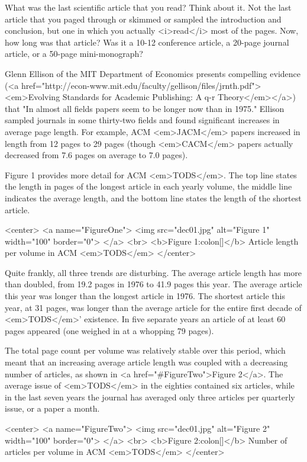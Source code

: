 What was the last scientific article that you read? Think about it.
Not the last article that you paged through or
skimmed or sampled the introduction and conclusion, but one in which you
actually <i>read</i> most of the pages. Now, how long was that article? 
Was it a 10-12
conference article, a 20-page journal article, or a 50-page mini-monograph?

Glenn Ellison of the MIT Department of Economics presents compelling
evidence (<a href="http://econ-www.mit.edu/faculty/gellison/files/jrnth.pdf"><em>Evolving Standards for Academic Publishing: A q-r Theory</em></a>) that
"In almost all fields papers seem to be longer now than in 1975." Ellison
sampled journals in some thirty-two fields and found significant increases
in average page length. For example, ACM <em>JACM</em> papers increased in
length from 12 pages to 29 pages (though <em>CACM</em> papers actually
decreased from 7.6 pages on average to 7.0 pages).

Figure 1 provides more detail for ACM <em>TODS</em>. The top
line states the length in pages of the longest article in each yearly
volume, the middle line indicates the average length, and the bottom
line states the length of the shortest article.

<center>
<a name="FigureOne">
<img src="dec01.jpg" alt="Figure 1" width="100" border="0">
</a>
<br>
<b>Figure 1:colon[]</b> Article length per volume in ACM <em>TODS</em>
</center>

Quite frankly, all three trends are disturbing. The average article length
has more than doubled, from 19.2 pages in 1976 to 41.9 pages this year. The
average article this year was longer than the longest article in 1976. The
shortest article this year, at 31 pages, was longer than the average article
for the entire first decade of <em>TODS</em>' existence. In five separate years
an article of at least 60 pages appeared (one weighed in at a whopping 79
pages).

The total page count per volume was relatively stable over this period,
which meant that an increasing average article length was coupled with a
decreasing number of articles, as shown in <a href="#FigureTwo">Figure 2</a>. 
The average
issue of <em>TODS</em> in the eighties contained six articles, while in the
last seven years the journal has averaged only three articles per quarterly
issue, or a paper a month.

<center>
<a name="FigureTwo">
<img src="dec01.jpg" alt="Figure 2" width="100" border="0">
</a>
<br>
<b>Figure 2:colon[]</b> Number of articles per volume in ACM <em>TODS</em>
</center>

